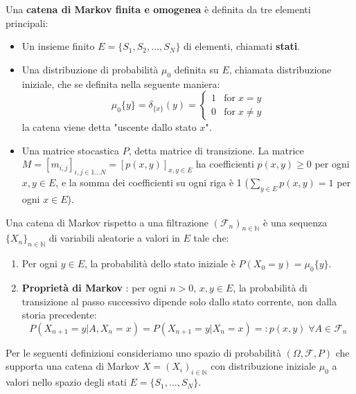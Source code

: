 \documentclass{article}
\begin{document}
\noindent
Una \textbf{catena di Markov finita e omogenea} \`e definita da tre elementi principali:

\begin{itemize}
    \item Un insieme finito $E = \{S_1, S_2, \dots, S_N\}$ di elementi, chiamati \textbf{stati}.
    \item Una distribuzione di probabilit\`a \textbf{$\mu_0$} definita su $E$, chiamata distribuzione iniziale, che se definita nella seguente maniera:
    $$
    \mu_0\{y\} = \delta_{\{x\}}(y) = \begin{cases}
                                      1 & \text{for} \; x = y \\
                                      0 & \text{for} \; x \neq y
                                      \end{cases}
    $$
    la catena viene detta "uscente dallo stato $x$".
    \item Una matrice stocastica \textbf{$P$}, detta matrice di transizione. La matrice $M = [m_{i,j}]_{i,j \in 1 \ldots N} = [p(x,y)]_{x,y \in E}$ ha coefficienti $p(x,y) \ge 0$ per ogni $x,y \in E$, e la somma dei coefficienti su ogni riga \`e 1 ($\sum_{y \in E} p(x, y) = 1$ per ogni $x \in E$).
\end{itemize}

Una catena di Markov rispetto a una filtrazione $(\mathcal{F}_n)_{n\in \mathbb{N}}$ \`e una sequenza $\{X_n\}_{n \in \mathbb{N}}$ di variabili aleatorie a valori in $E$ tale che:

\begin{enumerate}
    \item Per ogni $y \in E$, la probabilit\`a dello stato iniziale \`e $P(X_0 = y) = \mu_0\{y\}$.
    \item \textbf{Propriet\`a di Markov }: per ogni $n > 0$, $x, y \in E$, la probabilit\`a di transizione al passo successivo dipende solo dallo stato corrente, non dalla storia precedente:
    \[
    P(X_{n+1} = y | A, X_n = x) = P(X_{n+1} = y | X_n = x) =: p(x ,y) \; \forall A \in \mathcal{F}_n 
    \]
\end{enumerate}


\noindent
Per le seguenti definizioni consideriamo uno spazio di probabilità $(\Omega, \mathcal{F}, P)$ che supporta una catena di Markov $X = (X_i)_{i \in \mathbb{N}}$ con distribuzione iniziale $\mu_0$ a valori nello spazio degli stati $E = \{S_1, \ldots, S_N\}$. \\
\end{document}

